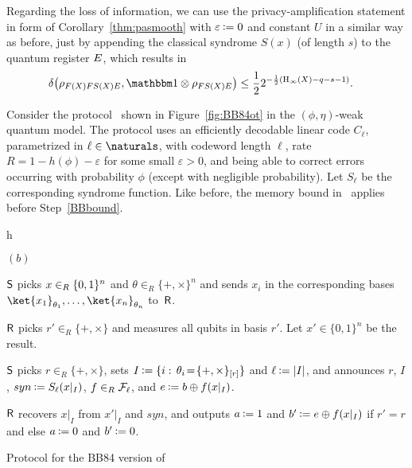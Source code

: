 Regarding the loss of information, we can use the
 privacy-amplification statement in form of
Corollary~\ref{thm:pasmooth} with $\eps \assign 0$ and constant $U$ in
a similar way as before, just by appending the classical syndrome
$S(x)$ (of length $s$) to the quantum register $E$, which results
in
%
\begin{align}  \label{ddbound}
  \dist{ \rho_{F(X) F S(X) \regE},\I \otimes \rho_{F S(X) \regE} }
&\leq \frac{1}{2} 2^{-\frac{1}{2}({\H_{\infty}(X)-q-s-1})}.
\end{align}

Consider the protocol \BBqot\ shown in Figure~\ref{fig:BB84ot} in the
$(\phi,\eta)$-weak quantum model. The protocol uses an efficiently
decodable linear code $C_{\ell}$, parametrized in $\ell \in
\naturals$, with codeword length $\ell$,
rate $R = 1 - h(\phi) - \varepsilon$ for some small $\varepsilon > 0$,
and being able to correct errors occurring with probability $\phi$
(except with negligible probability). Let $S_{\ell}$ be the
corresponding syndrome function.  Like before, the memory bound in
\BBqot\ applies before Step~\ref{BBbound}.


\begin{myfigure}{h}
\begin{myprotocol}{\BBqot$(b)$}
 \item ${\sf S}$ picks $x \in_R \{0,1\}^n$ and $\theta \in_R \{+,\times \}^n$
 and sends $x_i$ in the corresponding bases $\ket{x_1}_{\theta_1}, \ldots, \ket{x_n}_{\theta_n}$ to~${\sf R}$.
\item ${\sf R}$ picks $r'\in_R\{+,\times \}$ and measures all qubits in
    basis $r'$. Let $x'\in\{0,1\}^n$ be the result.
\item ${\sf S}$ picks $r \in_R \{+,\times \}$, sets $I \assign \Set{i}{\theta_i \!=\!\set{+,\times}_{[r]}}$ and $\ell \assign |I|$, and announces $r$, $I$, $syn \assign S_{\ell}(x|_{I})$, $f\in_R \mathcal{F}_{\ell}$, and $e \assign b\oplus \hf(x|_{I})$.\label{BBbound}
\item ${\sf R}$ recovers $x|_{I}$ from $x'|_{I}$ and $syn$, and outputs
  $a \assign 1$ and $b' \assign e \oplus \hf(x|_{I})$ if $r'=r$ and else $a
  \assign 0$ and $b' \assign 0$.
\end{myprotocol}
\caption{Protocol for the BB84 version of \RabinOT}\label{fig:BB84ot}
\end{myfigure}

